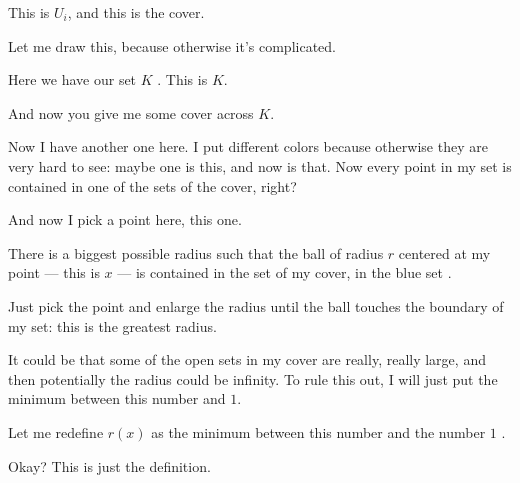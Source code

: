 \begin{proofWrapper}
\begin{speech}[01:09:11 - 01:10:46]
This is $U_i$, and this is the cover.
\end{speech}

\begin{speech}[01:10:46 - 01:12:43]
Let me draw this, because otherwise it's complicated.

Here we have our set $K$ . This is $K$.

And now you give me some cover  across $K$.

Now I have another one here. I put different colors because otherwise they are very hard to see: maybe one is this, and now is that. Now every point in my set is contained in one of the sets of the cover, right?

And now I pick a point here, this one.

There is a biggest possible radius such that the ball of radius $r$ centered at my point --- this is $x$ --- is contained in the set of my cover, in the blue set .

Just pick the point and enlarge the radius until the ball touches the boundary of my set: this is the greatest radius.

It could be that some of the open sets in my cover are really, really large, and then potentially the radius could be infinity. To rule this out, I will just put the minimum between this number and $1$.

Let me redefine $r(x)$ as the minimum between this number and the number $1$ .

Okay? This is just the definition.
\end{speech}

\begin{content}


\end{content}
\end{proofWrapper}
